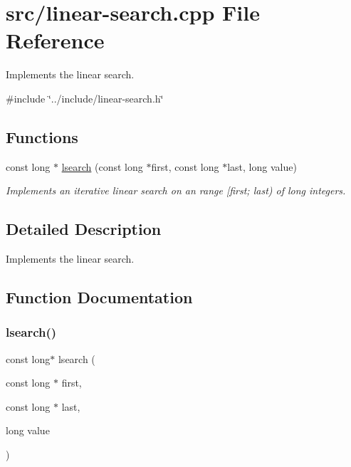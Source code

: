 \hypertarget{linear-search_8cpp}{}\section{src/linear-\/search.cpp File Reference}
\label{linear-search_8cpp}


Implements the linear search.  


{\ttfamily \#include \char`\"{}../include/linear-\/search.\+h\char`\"{}}\newline
\subsection*{Functions}
\begin{DoxyCompactItemize}
\item 
const long $\ast$ \mbox{\hyperlink{linear-search_8cpp_ad6bd0579112962baef5fde208a511e08}{lsearch}} (const long $\ast$first, const long $\ast$last, long value)
\begin{DoxyCompactList}\small\item\em Implements an iterative linear search on an range \mbox{[}first; last) of long integers. \end{DoxyCompactList}\end{DoxyCompactItemize}


\subsection{Detailed Description}
Implements the linear search. 



\subsection{Function Documentation}
\mbox{\label{linear-search_8cpp_ad6bd0579112962baef5fde208a511e08}} 
\subsubsection{\texorpdfstring{lsearch()}{lsearch()}}
{\footnotesize\ttfamily const long$\ast$ lsearch (\begin{DoxyParamCaption}\item[{const long $\ast$}]{first,  }\item[{const long $\ast$}]{last,  }\item[{long}]{value }\end{DoxyParamCaption})}




